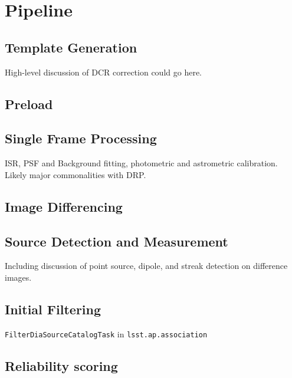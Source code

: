 
\section{Pipeline}


\subsection{Template Generation}


High-level discussion of DCR correction could go here.

\subsection{Preload}

\subsection{Single Frame Processing}


ISR, PSF and Background fitting, photometric and astrometric calibration.  Likely major commonalities with DRP.

\subsection{Image Differencing}

\subsection{Source Detection and Measurement}

Including discussion of point source, dipole, and streak detection on difference images.  


\subsection{Initial Filtering} \label{sec:filtering}

\texttt{FilterDiaSourceCatalogTask} in \texttt{lsst.ap.association}

\subsection{Reliability scoring}

